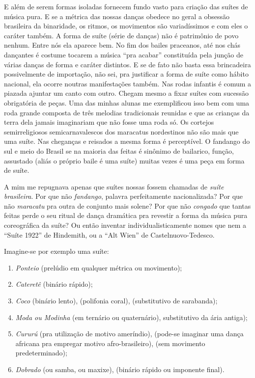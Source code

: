E além de serem formas isoladas fornecem fundo vasto para criação das
suítes de música pura. E se a métrica das nossas danças obedece no geral
a obsessão brasileira da binaridade, os ritmos, os movimentos são
variadíssimos e com eles o caráter também. A forma de suíte (série de
danças) não é patrimônio de povo nenhum. Entre nós ela aparece bem. No
fim dos bailes praceanos, até nos chás dançantes é costume tocarem a
música ``pra acabar'' constituída pela junção de várias danças de forma e
caráter distintos. E se de fato não basta essa brincadeira possivelmente
de importação, não sei, pra justificar a forma de suíte como hábito
nacional, ela ocorre noutras manifestações também. Nas rodas infantis é
comum a piazada ajuntar um canto com outro. Chegam mesmo a fixar suítes
com sucessão obrigatória de peças. Uma das minhas alunas me exemplificou
isso bem com uma roda grande composta de três melodias tradicionais
reunidas e que as crianças da terra dela jamais imaginariam que não
fosse uma roda só. Os cortejos semirreligiosos semicarnavalescos dos
maracatus nordestinos não são mais que uma suíte. Nas cheganças e
reisados a mesma forma é perceptível. O fandango do sul e meio do Brasil
se na maioria das feitas é sinônimo de bailarico, função, assustado
(aliás o próprio baile é uma suíte) muitas vezes é uma peça em forma de
suíte.

A mim me repugnava apenas que suítes nossas fossem chamadas de \textit{suíte
brasileira}. Por que não \textit{fandango}, palavra perfeitamente
nacionalizada? Por que não \textit{maracatu} pra outra de conjunto mais solene?
Por que não \textit{congado} que tantas feitas perde o seu ritual de dança
dramática pra revestir a forma da música pura coreográfica da suíte? Ou
então inventar individualisticamente nomes que nem a ``Suíte 1922'' de
Hindemith, ou a ``Alt Wien'' de Castelnuovo-Tedesco.

Imagine-se por exemplo uma suíte:

\begin{enumerate}
\item\textit{Ponteio} (prelúdio em qualquer métrica ou movimento);
\item\textit{Cateretê} (binário rápido);
\item\textit{Coco} (binário lento), (polifonia coral), (substitutivo de sarabanda);
\item\textit{Moda ou Modinha} (em ternário ou quaternário), substitutivo da ária antiga);
\item\textit{Cururú} (pra utilização de motivo ameríndio), (pode-se imaginar
  uma dança africana pra empregar motivo afro-brasileiro), (sem
  movimento predeterminado);
\item\textit{Dobrado} (ou samba, ou maxixe), (binário rápido ou imponente final).
\end{enumerate}

